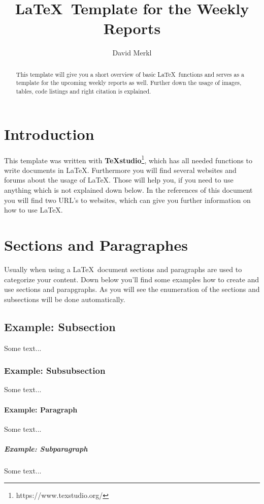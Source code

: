 \documentclass[]{article}
\title{\LaTeX\  Template for the Weekly Reports}
\author{David Merkl}
\begin{document}
\maketitle

\begin{abstract}
This template will give you a short overview of basic \LaTeX\ functions and serves as a template for the upcoming weekly reports as well. Further down the usage of images, tables, code listings and right citation is explained. 
\end{abstract}

\section{Introduction}
This template was written with \textbf{TeXstudio}\footnote{https://www.texstudio.org/}, which has all needed functions to write documents in \LaTeX. Furthermore you will find several websites and forums about the usage of \LaTeX. Those will help you, if you need to use anything which is not explained down below. In the references of this document you will find two URL's to websites, which can give you further information on how to use \LaTeX. 

\section{Sections and Paragraphes}
Usually when using a \LaTeX\ document sections and paragraphs are used to categorize your content. Down below you'll find some examples how to create and use sections and parapgraphs. As you will see the enumeration of the sections and subsections will be done automatically. 

\subsection{Example: Subsection}
Some text...

\subsubsection{Example: Subsubsection}
Some text...

\paragraph{Example: Paragraph}
Some text...

\subparagraph{Example: Subparagraph}
Some text...
\end{document}
